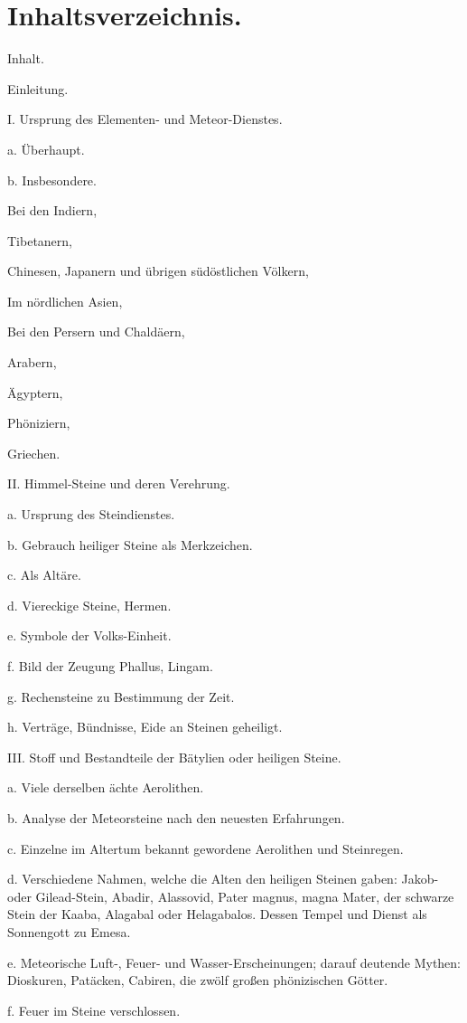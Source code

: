 \documentclass[a4paper, 11pt, oneside, polutonikogreek, german]{article}
\begin{document}
\section*{Inhaltsverzeichnis.}
Inhalt.

Einleitung.

I. Ursprung des Elementen- und Meteor-Dienstes.

a. Überhaupt.

b. Insbesondere.

Bei den Indiern,

Tibetanern,

Chinesen, Japanern und übrigen südöstlichen Völkern,

Im nördlichen Asien,

Bei den Persern und Chaldäern,

Arabern,

Ägyptern,

Phöniziern,

Griechen.

II. Himmel-Steine und deren Verehrung.

a. Ursprung des Steindienstes.

b. Gebrauch heiliger Steine als Merkzeichen.

c. Als Altäre.

d. Viereckige Steine, Hermen.

e. Symbole der Volks-Einheit.

f. Bild der Zeugung Phallus, Lingam.

g. Rechensteine zu Bestimmung der Zeit.

h. Verträge, Bündnisse, Eide an Steinen geheiligt.

III. Stoff und Bestandteile der Bätylien oder heiligen Steine.

a. Viele derselben ächte Aerolithen.

b. Analyse der Meteorsteine nach den neuesten Erfahrungen.

c. Einzelne im Altertum bekannt gewordene Aerolithen und Steinregen.

d. Verschiedene Nahmen, welche die Alten den heiligen Steinen gaben: Jakob- oder Gilead-Stein, Abadir, Alassovid, Pater magnus, magna Mater, der schwarze Stein der Kaaba, Alagabal oder Helagabalos. Dessen Tempel und Dienst als Sonnengott zu Emesa.

e. Meteorische Luft-, Feuer- und Wasser-Erscheinungen; darauf deutende Mythen: Dioskuren, Patäcken, Cabiren, die zwölf großen phönizischen Götter.

f. Feuer im Steine verschlossen.
\end{document}
